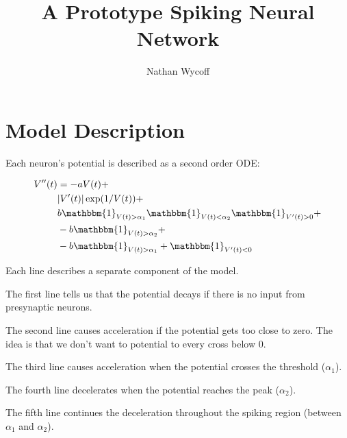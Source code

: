 \documentclass[a4paper]{article}
\title{A Prototype Spiking Neural Network}
\author{Nathan Wycoff}
\begin{document}
\maketitle

\section{Model Description}

Each neuron's potential is described as a second order ODE:

\begin{equation} \label{eq1}
\begin{split}
V''(t) & = -aV(t) + \\
& |V'(t)| \exp(1/V(t))  + \\
 & b \mathbbm{1}_{V(t) > \alpha_1}\mathbbm{1}_{V(t) < \alpha_2}\mathbbm{1}_{V'(t) > 0} + \\
& -b \mathbbm{1}_{V(t) > \alpha_2} + \\
& -b \mathbbm{1}_{V(t) > \alpha_1} + \mathbbm{1}_{V'(t) < 0}
\end{split}
\end{equation}

Each line describes a separate component of the model. 

The first line tells us that the potential decays if there is no input from presynaptic neurons.

The second line causes acceleration if the potential gets too close to zero. The idea is that we don't want to potential to every cross below 0.

The third line causes acceleration when the potential crosses the threshold ($\alpha_1$).

The fourth line decelerates when the potential reaches the peak ($\alpha_2$).

The fifth line continues the deceleration throughout the spiking region (between $\alpha_1$ and $\alpha_2$).
\end{document}
